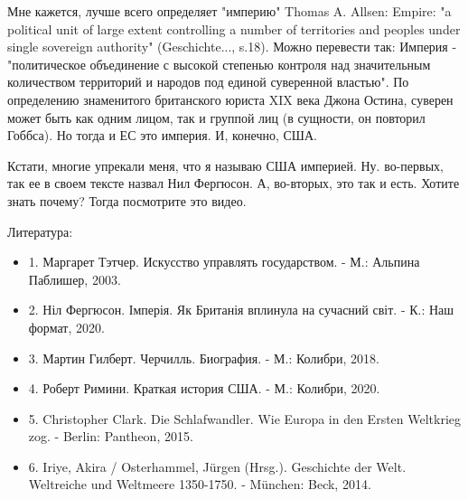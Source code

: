 Мне кажется, лучше всего определяет "империю" Thomas A. Allsen: Empire: "a
political unit of large extent controlling a number of territories and peoples
under single sovereign authority" (Geschichte..., s.18). Можно перевести так:
Империя - "политическое объединение с высокой степенью контроля над
значительным количеством территорий и народов под единой суверенной властью".
По определению знаменитого британского юриста XIX века Джона Остина, суверен
может быть как одним лицом, так и группой лиц (в сущности, он повторил Гоббса).
Но тогда и ЕС это империя. И, конечно, США. 

Кстати, многие упрекали меня, что я называю США империей. Ну. во-первых, так ее
в своем тексте назвал Нил Фергюсон. А, во-вторых, это так и есть. Хотите знать
почему? Тогда посмотрите это видео. 

Литература: 

\begin{itemize}
  \item 1. Маргарет Тэтчер. Искусство управлять государством. - М.: Альпина Паблишер, 2003.
  \item 2. Ніл Фергюсон. Імперія. Як Британія вплинула на сучасний світ. - К.: Наш формат, 2020. 
  \item 3. Мартин Гилберт. Черчилль. Биография. - М.: Колибри, 2018.
  \item 4. Роберт Римини. Краткая история США. - М.: Колибри, 2020.
  \item 5. Christopher Clark. Die Schlafwandler. Wie Europa in den Ersten Weltkrieg zog. - Berlin: Pantheon, 2015. 
  \item 6. Iriye, Akira / Osterhammel, Jürgen (Hrsg.). Geschichte der Welt. Weltreiche und Weltmeere 1350-1750. - München: Beck, 2014.
\end{itemize}
